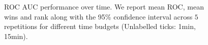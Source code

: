 \documentclass{article}
\begin{document}
\begin{figure}[t]
     \centering
     \begin{subfigure}[t]{0.32\textwidth}
         \centering
         
     \end{subfigure}
     \begin{subfigure}[t]{0.32\textwidth}
         \centering
         
     \end{subfigure}
     \begin{subfigure}[t]{0.32\textwidth}
         \centering
         
     \end{subfigure}
     \vspace{-.6cm}
     \begin{subfigure}[b]{1.0\textwidth}
         \centering
         
     \end{subfigure}
     \vspace{.3cm}
     \caption{ROC AUC performance over time. We report mean ROC, mean wins and rank along with the 95\% confidence interval across $5$ repetitions for different time budgets (Unlabelled ticks: 1min, 15min). %
     }
     \label{fig:perfovertime}
\end{figure}
\end{document}
